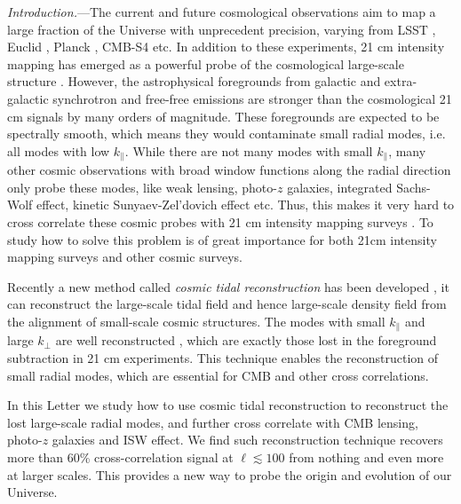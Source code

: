 \documentclass[aps,prl,twocolumn,showpacs,superscriptaddress,groupedaddress,nofootinbib,floatfix]{revtex4}  %
\renewcommand{\section}[1]{\emph{#1.}---\ignorespacesandimplicitepars}
\begin{document}
\pacs{}
\maketitle


{\it Introduction.}---The current and future cosmological observations aim
to map a large fraction of the Universe with unprecedent precision, varying
from LSST \cite{2009:lsst}, Euclid \cite{2012:euclid}, 
Planck \cite{2015arXiv150201582P}, CMB-S4 \cite{2014ApJ...788..138W} etc. 
In addition to these experiments, 21 cm intensity mapping has emerged as
a powerful probe of the 
cosmological large-scale structure \cite{2008:21cm,chang}.
However, the astrophysical foregrounds from galactic and extra-galactic
synchrotron and free-free emissions are stronger than the cosmological 21 cm 
signals by many orders of magnitude. These foregrounds are expected to be 
spectrally smooth, which means they would contaminate small radial
modes, i.e. all modes with low $k_\parallel$.
While there are not many modes with small $k_\parallel$, many other cosmic
observations with broad window functions along the radial direction only 
probe these modes, like weak lensing, photo-$z$ galaxies, 
integrated Sachs-Wolf effect, kinetic Sunyaev-Zel'dovich effect etc.  
Thus, this makes it very hard to cross correlate these cosmic probes with 
21 cm intensity mapping surveys 
\cite{2007ApJ...660.1030F,2008MNRAS.384..291A}. 
To study how to solve this problem is of great importance for both 21cm 
intensity mapping surveys and other cosmic surveys.

Recently a new method called {\it cosmic tidal reconstruction} has been 
developed \cite{2012:pen,2015:zhu}, it can reconstruct the large-scale 
tidal field and hence large-scale density field from the alignment of 
small-scale cosmic structures.
The modes with small $k_\parallel$ and large $k_\perp$ are well 
reconstructed \cite{2015:zhu}, which are exactly those lost in the foreground 
subtraction in 21 cm experiments. 
This technique enables the reconstruction of small radial modes, which are 
essential for CMB and other cross correlations.

In this Letter we study how to use cosmic tidal reconstruction to 
reconstruct the lost large-scale radial modes, and further cross correlate with
CMB lensing, photo-$z$ galaxies and ISW effect. 
We find such reconstruction technique recovers more than 60\% cross-correlation 
signal at $\ell\lesssim100$ from nothing and even more at larger scales. 
This provides a new way to probe the origin and evolution of our Universe.
\end{document}
